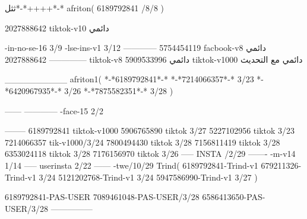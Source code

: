 ثثل*-*++++*-*
afriton(
6189792841 /8/8
)

2027888642 tiktok-v10
دائمي

-in-no-se-16 3/9
-lse-ins-v1 3/12
------------
5754454119 facbook-v8
دائمي
--------------
2027888642 tiktok-v8
دائمي
5909533996 tiktok-v1000
دائمي مع التحديث

__________
afriton1(
*-*6189792841*-*
*-*7214066357*-* 3/23
*-*6420967935*-* 3/26
*-*7875582351*-* 3/28
)


------
------------
-face-15 2/2

--------
6189792841 tiktok-v1000
5906765890 tiktok 3/27
5227102956 tiktok 3/23
7214066357 tik-v1000/3/24
7800494430 tiktok 3/28
7156811419 tiktok 3/28
6353024118 tiktok 3/28
7176156970 tiktok 3/26
-----
 INSTA /2/29
-------
-m-v14 1/14
-----
userinsta 2/22
------
-twe/10/29
Trind(
6189792841-Trind-v1 
679211326-Trind-v1 3/24
5121202768-Trind-v1 3/24
5947586990-Trind-v1 3/27
)

6189792841-PAS-USER
7089461048-PAS-USER/3/28
6586413650-PAS-USER/3/28
    ---------------
